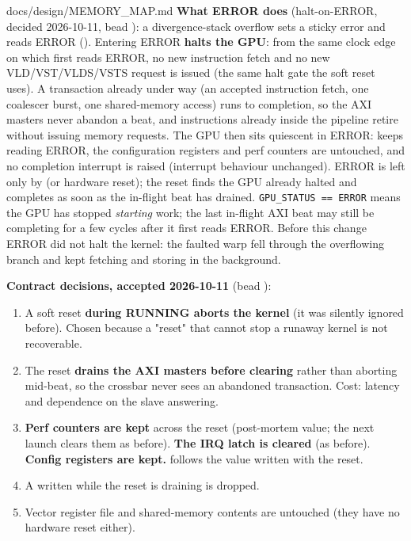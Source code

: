 \begin{relocated}{docs/design/MEMORY_MAP.md}
\textbf{What ERROR does} (halt-on-ERROR, decided 2026-10-11, bead
): a divergence-stack overflow sets a sticky error and
 reads ERROR (). Entering ERROR \textbf{halts
the GPU}: from the same clock edge on which  first
reads ERROR, no new instruction fetch and no new
VLD/\allowbreak{}VST/\allowbreak{}VLDS/\allowbreak{}VSTS request is
issued (the same halt gate the soft reset uses). A transaction already
under way (an accepted instruction fetch, one coalescer burst, one
shared-memory access) runs to completion, so the AXI masters never
abandon a beat, and instructions already inside the pipeline retire
without issuing memory requests. The GPU then sits quiescent in ERROR:
 keeps reading ERROR, the configuration registers and
perf counters are untouched, and no completion interrupt is raised
(interrupt behaviour unchanged). ERROR is left only by
 (or hardware reset); the reset finds the GPU
already halted and completes as soon as the in-flight beat has drained.
\texttt{GPU\_\allowbreak{}STATUS\ =\allowbreak{}=\allowbreak{}\ ERROR}
means the GPU has stopped \emph{starting} work; the last in-flight AXI
beat may still be completing for a few cycles after it first reads
ERROR. Before this change ERROR did not halt the kernel: the faulted
warp fell through the overflowing branch and kept fetching and storing
in the background.

\textbf{Contract decisions, accepted 2026-10-11} (bead ):

\begin{enumerate}
\def\labelenumi{\arabic{enumi}.}
\tightlist
\item
  A soft reset \textbf{during RUNNING aborts the kernel} (it was
  silently ignored before). Chosen because a "reset" that cannot stop a
  runaway kernel is not recoverable.
\item
  The reset \textbf{drains the AXI masters before clearing} rather than
  aborting mid-beat, so the crossbar never sees an abandoned
  transaction. Cost: latency and dependence on the slave answering.
\item
  \textbf{Perf counters are kept} across the reset (post-mortem value;
  the next launch clears them as before). \textbf{The IRQ latch is
  cleared} (as before). \textbf{Config registers are kept.}
   follows the value written with the reset.
\item
  A  written while the reset is draining is dropped.
\item
  Vector register file and shared-memory contents are untouched (they
  have no hardware reset either).
\end{enumerate}


\end{relocated}
